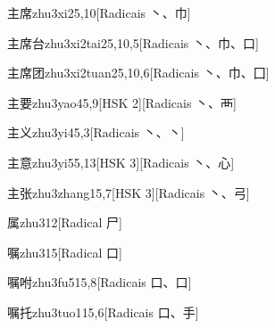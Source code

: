 \begin{entry}{主席}{zhu3xi2}{5,10}[Radicais ⼂、⼱]
\end{entry}

\begin{entry}{主席台}{zhu3xi2tai2}{5,10,5}[Radicais ⼂、⼱、⼝]
\end{entry}

\begin{entry}{主席团}{zhu3xi2tuan2}{5,10,6}[Radicais ⼂、⼱、⼞]
\end{entry}

\begin{entry}{主要}{zhu3yao4}{5,9}[HSK 2][Radicais ⼂、⾑]
\end{entry}

\begin{entry}{主义}{zhu3yi4}{5,3}[Radicais ⼂、⼂]
\end{entry}

\begin{entry}{主意}{zhu3yi5}{5,13}[HSK 3][Radicais ⼂、⼼]
\end{entry}

\begin{entry}{主张}{zhu3zhang1}{5,7}[HSK 3][Radicais ⼂、⼸]
\end{entry}

\begin{entry}{属}{zhu3}{12}[Radical ⼫]
\end{entry}

\begin{entry}{嘱}{zhu3}{15}[Radical ⼝]
\end{entry}

\begin{entry}{嘱咐}{zhu3fu5}{15,8}[Radicais ⼝、⼝]
\end{entry}

\begin{entry}{嘱托}{zhu3tuo1}{15,6}[Radicais ⼝、⼿]
\end{entry}

